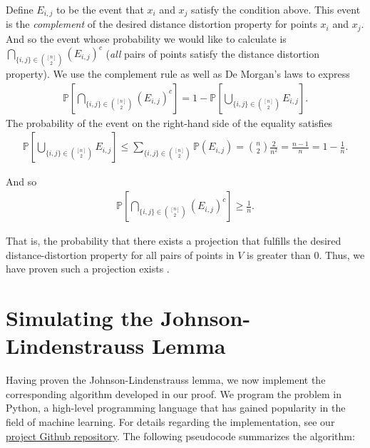 \documentclass{article}
\begin{document}
Define $E_{i, j}$ to be the event that $x_i$ and $x_j$ satisfy the condition above. This event is the \textit{complement} of the desired distance distortion property for points $x_i$ and $x_j$. And so the event whose probability we would like to calculate is $\bigcap_{ \{i, j\} \in \binom{[n]}{2}} (E_{i, j})^c$ (\textit{all} pairs of points satisfy the distance distortion property). We use the complement rule as well as De Morgan's laws to express
\begin{align*}
    \mathbb{P} \left[\bigcap_{ \{i, j\} \in \binom{[n]}{2}} (E_{i, j})^c \right] = 1 - \mathbb{P} \left[\bigcup_{ \{i, j\} \in \binom{[n]}{2}} E_{i, j} \right].
\end{align*}
The probability of the event on the right-hand side of the equality satisfies
\begin{align*}
    \mathbb{P} \left[\bigcup_{ \{i, j\} \in \binom{[n]}{2}} E_{i, j} \right] \leq \sum_{ \{i, j\} \in \binom{[n]}{2}} \mathbb{P}(E_{i,j}) = \binom{n}{2} \frac{2}{n^2} = \frac{n-1}{n} = 1 - \frac{1}{n}.
\end{align*}

And so
\begin{align*}
    \mathbb{P} \left[\bigcap_{ \{i, j\} \in \binom{[n]}{2}} (E_{i, j})^c \right] \geq \frac{1}{n}.
\end{align*}

That is, the probability that there exists a projection that fulfills the desired distance-distortion property for all pairs of points in $V$ is greater than 0. Thus, we have proven such a projection exists \cite{Mahoney09}.

\newpage
\section{Simulating the Johnson-Lindenstrauss Lemma}

Having proven the Johnson-Lindenstrauss lemma, we now implement the corresponding algorithm developed in our proof. We program the problem in Python, a high-level programming language that has gained popularity in the field of machine learning. For details regarding the implementation, see our \href{https://github.com/smithhenryd/Johnson-Lindenstrauss}{project Github repository}. The following pseudocode summarizes the algorithm:
\end{document}

